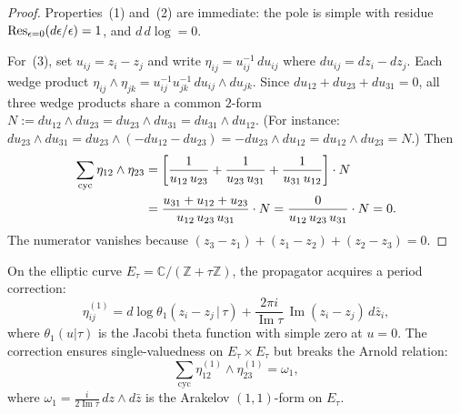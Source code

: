 \begin{proof}
Properties~(1) and~(2) are immediate: the pole is simple with
residue $\operatorname{Res}_{\epsilon=0}(d\epsilon/\epsilon) = 1$, and
$d\,d\!\log = 0$.

For~(3), set $u_{ij} = z_i - z_j$ and write
$\eta_{ij} = u_{ij}^{-1}\,du_{ij}$ where
$du_{ij} = dz_i - dz_j$.
Each wedge product
$\eta_{ij} \wedge \eta_{jk}
 = u_{ij}^{-1} u_{jk}^{-1}\, du_{ij} \wedge du_{jk}$.
Since $du_{12} + du_{23} + du_{31} = 0$, all three wedge products
share a common $2$-form
$N := du_{12} \wedge du_{23}
= du_{23} \wedge du_{31} = du_{31} \wedge du_{12}$.
(For instance:
$du_{23} \wedge du_{31}
= du_{23} \wedge (-du_{12} - du_{23})
= -du_{23} \wedge du_{12} = du_{12} \wedge du_{23} = N$.)
Then
\begin{align}
\sum_{\mathrm{cyc}} \eta_{12} \wedge \eta_{23}
&= \left[
  \frac{1}{u_{12}\,u_{23}}
  + \frac{1}{u_{23}\,u_{31}}
  + \frac{1}{u_{31}\,u_{12}}
\right] \cdot N
\notag \\
&= \frac{u_{31} + u_{12} + u_{23}}{u_{12}\,u_{23}\,u_{31}}
  \cdot N
= \frac{0}{u_{12}\,u_{23}\,u_{31}} \cdot N = 0.
\label{eq:fourier-arnold-computation}
\end{align}
The numerator vanishes because
$(z_3 - z_1) + (z_1 - z_2) + (z_2 - z_3) = 0$.
\end{proof}

\begin{proposition}
\label{prop:fourier-genus1-propagator}
On the elliptic curve
$E_\tau = \mathbb{C}/(\mathbb{Z} + \tau\mathbb{Z})$, the
propagator acquires a period correction:
\begin{equation}\label{eq:fourier-genus1-propagator}
\eta^{(1)}_{ij} = d\log\theta_1(z_i - z_j \,|\, \tau)
+ \frac{2\pi i}{\operatorname{Im}\tau}\,
  \operatorname{Im}(z_i - z_j)\,d\bar{z}_i,
\end{equation}
where $\theta_1(u|\tau)$ is the Jacobi theta function with simple
zero at $u = 0$.  The correction ensures single-valuedness on
$E_\tau \times E_\tau$ but breaks the Arnold relation:
\begin{equation}\label{eq:fourier-arnold-failure}
\sum_{\mathrm{cyc}} \eta^{(1)}_{12} \wedge \eta^{(1)}_{23}
= \omega_1,
\end{equation}
where
$\omega_1 = \frac{i}{2\operatorname{Im}\tau}\,dz \wedge d\bar{z}$
is the Arakelov $(1,1)$-form on $E_\tau$.
\end{proposition}

